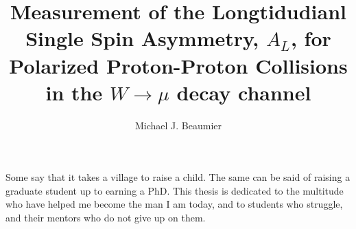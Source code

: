 \documentclass[oneside,final, letterpaper]{ucr}
\begin{document}

\title{Measurement of the Longtidudianl Single Spin Asymmetry, $A_L$, for Polarized Proton-Proton Collisions in the $W\rightarrow\mu$ decay channel}
\author{Michael J. Beaumier}

\maketitle
\copyrightpage{}
\approvalpage{}


\begin{frontmatter}

\begin{acknowledgements}
	
\end{acknowledgements}

\begin{dedication}
\null\vfil
{\large
\begin{center}
	Some say that it takes a village to raise a child. The same can be said of
	raising a graduate student up to earning a PhD. This thesis is dedicated to
	the multitude who have helped me become the man I am today, and to students
	who struggle, and their mentors who do not give up on them. \\
\end{center}}
\vfil\null
\end{dedication}



\tableofcontents
\listoffigures
\listoftables
\end{frontmatter}










\nocite{*}
% 



\end{document}
